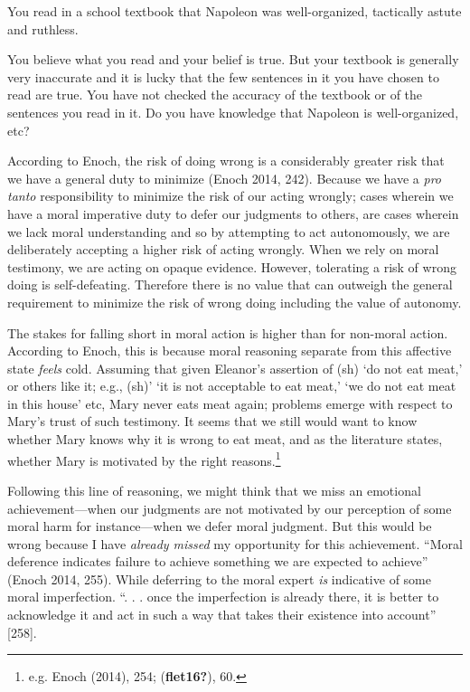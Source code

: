 \documentclass[12pt]{book}
\theoremstyle{definition}
\theoremstyle{remark}
\newcommand{\NormalTok}[1]{#1}
\newenvironment{Shaded}{}{}
\newenvironment{Highlighting}{}{}
\begin{document}
\begin{Shaded}
\begin{Highlighting}[]

\NormalTok{You read in a school textbook that Napoleon was well{-}organized, tactically astute and ruthless.}
\end{Highlighting}
\end{Shaded}

You believe what you read and your belief is true. But your textbook is generally very inaccurate and it is lucky that the few sentences in it you have chosen to read are true. You have not checked the accuracy of the textbook or of the sentences you read in it. Do you have knowledge that Napoleon is well-organized, etc?

According to Enoch, the risk of doing wrong is a considerably greater risk that we have a general duty to minimize (Enoch 2014, 242). Because we have a \emph{pro tanto} responsibility to minimize the risk of our acting wrongly; cases wherein we have a moral imperative duty to defer our judgments to others, are cases wherein we lack moral understanding and so by attempting to act autonomously, we are deliberately accepting a higher risk of acting wrongly. When we rely on moral testimony, we are acting on opaque evidence. However, tolerating a risk of wrong doing is self-defeating. Therefore there is no value that can outweigh the general requirement to minimize the risk of wrong doing including the value of autonomy.

The stakes for falling short in moral action is higher than for non-moral action. According to Enoch, this is because moral reasoning separate from this affective state \emph{feels} cold. Assuming that given Eleanor's assertion of (sh) `do not eat meat,' or others like it; e.g., (sh)' `it is not acceptable to eat meat,' `we do not eat meat in this house' etc, Mary never eats meat again; problems emerge with respect to Mary's trust of such testimony. It seems that we still would want to know whether Mary knows why it is wrong to eat meat, and as the literature states, whether Mary is motivated by the right reasons.\footnote{e.g. Enoch (2014), 254; (\textbf{flet16?}), 60.}

Following this line of reasoning, we might think that we miss an emotional achievement---when our judgments are not motivated by our perception of some moral harm for instance---when we defer moral judgment. But this would be wrong because I have \emph{already missed} my opportunity for this achievement. ``Moral deference indicates failure to achieve something we are expected to achieve'' (Enoch 2014, 255). While deferring to the moral expert \emph{is} indicative of some moral imperfection. ``. . . once the imperfection is already there, it is better to acknowledge it and act in such a way that takes their existence into account'' {[}258{]}.
\end{document}
